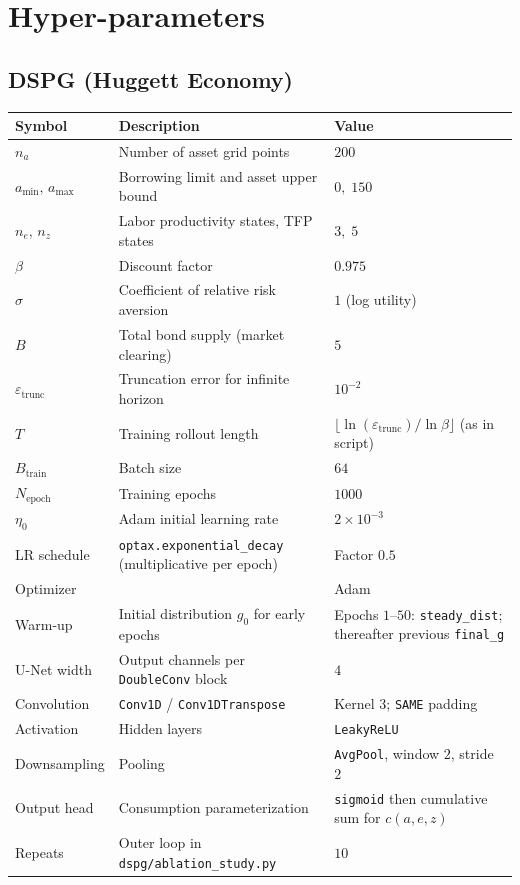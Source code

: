 \section{Hyper-parameters}
\label{appendix_hyper_params}

\subsection{DSPG (Huggett Economy)}
\label{appendix_hyper_dspg_huggett}
\begin{table}[H]
  \centering
  \small
  \setlength{\tabcolsep}{6pt}
  \renewcommand{\arraystretch}{1.15}
  \begin{tabular}{@{}p{2.4cm}p{6.2cm}p{4.8cm}@{}}
    \toprule
    Symbol & Description & Value \\
    \midrule
    $n_a$ & Number of asset grid points & $200$ \\
    $a_{\min},\,a_{\max}$ & Borrowing limit and asset upper bound & $0,\;150$ \\
    $n_e,\,n_z$ & Labor productivity states, TFP states & $3,\;5$ \\
    $\beta$ & Discount factor & $0.975$ \\
    $\sigma$ & Coefficient of relative risk aversion & $1$ (log utility) \\
    $B$ & Total bond supply (market clearing) & $5$ \\
    $\varepsilon_{\mathrm{trunc}}$ & Truncation error for infinite horizon & $10^{-2}$ \\
    $T$ & Training rollout length & $\lfloor \ln(\varepsilon_{\mathrm{trunc}})/\ln\beta\rfloor$ (as in script) \\
    $B_{\mathrm{train}}$ & Batch size & $64$ \\
    $N_{\mathrm{epoch}}$ & Training epochs & $1000$ \\
    $\eta_0$ & Adam initial learning rate & $2\times 10^{-3}$ \\
    LR schedule & \texttt{optax.exponential\_decay} (multiplicative per epoch) & Factor $0.5$ \\
    Optimizer & & Adam \\
    Warm-up & Initial distribution $g_0$ for early epochs & Epochs $1$--$50$: \texttt{steady\_dist}; thereafter previous \texttt{final\_g} \\
    U-Net width & Output channels per \texttt{DoubleConv} block & $4$ \\
    Convolution & \texttt{Conv1D} / \texttt{Conv1DTranspose} & Kernel $3$; \texttt{SAME} padding \\
    Activation & Hidden layers & \texttt{LeakyReLU} \\
    Downsampling & Pooling & \texttt{AvgPool}, window $2$, stride $2$ \\
    Output head & Consumption parameterization & \texttt{sigmoid} then cumulative sum for $c(a,e,z)$ \\
    Repeats & Outer loop in \texttt{dspg/ablation\_study.py} & $10$ \\
    \bottomrule
  \end{tabular}
\end{table}

